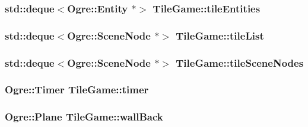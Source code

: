 \hypertarget{classTileGame_aad2a30c885c91193d0a6da18f1477de5}{
\subsubsection[{tile\-Entities}]{\setlength{\rightskip}{0pt plus 5cm}std\-::deque$<$Ogre\-::\-Entity $\ast$$>$ Tile\-Game\-::tile\-Entities\hspace{0.3cm}{\ttfamily [protected]}}}\label{classTileGame_aad2a30c885c91193d0a6da18f1477de5}
\hypertarget{classTileGame_ad9bec31020eaa7dc719d8e9b8af20ee2}{
\subsubsection[{tile\-List}]{\setlength{\rightskip}{0pt plus 5cm}std\-::deque$<$Ogre\-::\-Scene\-Node $\ast$$>$ Tile\-Game\-::tile\-List\hspace{0.3cm}{\ttfamily [protected]}}}\label{classTileGame_ad9bec31020eaa7dc719d8e9b8af20ee2}
\hypertarget{classTileGame_ac8b228c7849cb924a099f94de266c42d}{
\subsubsection[{tile\-Scene\-Nodes}]{\setlength{\rightskip}{0pt plus 5cm}std\-::deque$<$Ogre\-::\-Scene\-Node $\ast$$>$ Tile\-Game\-::tile\-Scene\-Nodes\hspace{0.3cm}{\ttfamily [protected]}}}\label{classTileGame_ac8b228c7849cb924a099f94de266c42d}
\hypertarget{classTileGame_adbfc142c4bd14007f4aec65b164bbea7}{
\subsubsection[{timer}]{\setlength{\rightskip}{0pt plus 5cm}Ogre\-::\-Timer Tile\-Game\-::timer\hspace{0.3cm}{\ttfamily [protected]}}}\label{classTileGame_adbfc142c4bd14007f4aec65b164bbea7}
\hypertarget{classTileGame_a3c37c43bfc4c0387a3f29f783e4f436a}{
\subsubsection[{wall\-Back}]{\setlength{\rightskip}{0pt plus 5cm}Ogre\-::\-Plane Tile\-Game\-::wall\-Back\hspace{0.3cm}{\ttfamily [protected]}}}\label{classTileGame_a3c37c43bfc4c0387a3f29f783e4f436a}
